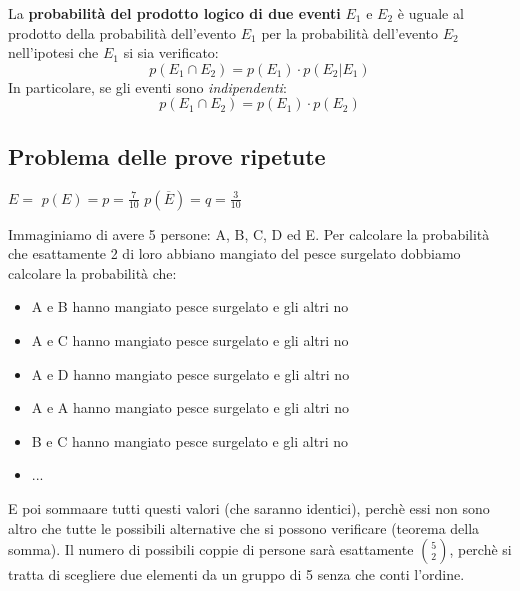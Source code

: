 \documentclass{article}     %
\begin{document}
                \begin{thm}
                    La \textbf{probabilità del prodotto logico di due eventi} $E_1$ e $E_2$ è uguale al prodotto della probabilità dell'evento $E_1$ per la probabilità dell'evento $E_2$ nell'ipotesi che $E_1$ si sia verificato:
                    \[p(E_1\cap E_2)=p(E_1)\cdot p(E_2|E_1)\]
                    In particolare, se gli eventi sono \textit{indipendenti}:
                    \[p(E_1\cap E_2)=p(E_1)\cdot p(E_2)\]
                \end{thm}

            \subsection{Problema delle prove ripetute}
            \begin{ex}
                    \noindent
                $E=$  \qquad
                $p(E)=p=\frac{7}{10}$ \qquad
                $p(\overline{E})=q=\frac{3}{10}$

                Immaginiamo di avere 5 persone: A, B, C, D ed E. Per calcolare la probabilità che esattamente 2 di loro abbiano mangiato del pesce surgelato dobbiamo calcolare la probabilità che:
                \begin{itemize}
                    \item A e B hanno mangiato pesce surgelato e gli altri no
                    \item A e C hanno mangiato pesce surgelato e gli altri no
                    \item A e D hanno mangiato pesce surgelato e gli altri no
                    \item A e A hanno mangiato pesce surgelato e gli altri no
                    \item B e C hanno mangiato pesce surgelato e gli altri no
                    \item ...
                \end{itemize}
                E poi sommaare tutti questi valori (che saranno identici), perchè essi non sono altro che tutte le possibili alternative che si possono verificare (teorema della somma). Il numero di possibili coppie di persone sarà esattamente $\binom{5}{2}$, perchè si tratta di scegliere due elementi da un gruppo di 5 senza che conti l'ordine. 


\end{ex}
\end{document}
